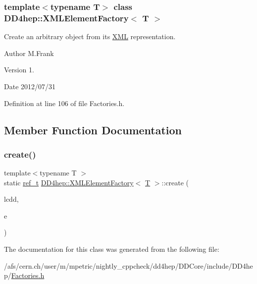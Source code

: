 \subsubsection*{template$<$typename T$>$\newline
class D\+D4hep\+::\+X\+M\+L\+Element\+Factory$<$ T $>$}

Create an arbitrary object from it\textquotesingle{}s \hyperlink{namespace_d_d4hep_1_1_x_m_l}{X\+ML} representation. 

\begin{DoxyAuthor}{Author}
M.\+Frank 
\end{DoxyAuthor}
\begin{DoxyVersion}{Version}
1. 
\end{DoxyVersion}
\begin{DoxyDate}{Date}
2012/07/31 
\end{DoxyDate}


Definition at line 106 of file Factories.\+h.



\subsection{Member Function Documentation}
\hypertarget{class_d_d4hep_1_1_x_m_l_element_factory_ae05e7a1e9fad323da9527efc778a9cd4}{}\label{class_d_d4hep_1_1_x_m_l_element_factory_ae05e7a1e9fad323da9527efc778a9cd4} 
\subsubsection{\texorpdfstring{create()}{create()}}
{\footnotesize\ttfamily template$<$typename T $>$ \\
static \hyperlink{struct_d_d4hep_1_1_plugin_factory_base_ab13458952a5b4a91f5130d3ee4db4d33}{ref\+\_\+t} \hyperlink{class_d_d4hep_1_1_x_m_l_element_factory}{D\+D4hep\+::\+X\+M\+L\+Element\+Factory}$<$ \hyperlink{class_t}{T} $>$\+::create (\begin{DoxyParamCaption}\item[{\hyperlink{class_d_d4hep_1_1_geometry_1_1_l_c_d_d}{Geometry\+::\+L\+C\+DD} \&}]{lcdd,  }\item[{\hyperlink{struct_d_d4hep_1_1_plugin_factory_base_aedebe6835e2705756763812545bcb8fd}{xml\+\_\+h}}]{e }\end{DoxyParamCaption})\hspace{0.3cm}{\ttfamily [static]}}



The documentation for this class was generated from the following file\+:\begin{DoxyCompactItemize}
\item 
/afs/cern.\+ch/user/m/mpetric/nightly\+\_\+cppcheck/dd4hep/\+D\+D\+Core/include/\+D\+D4hep/\hyperlink{_d_d_core_2include_2_d_d4hep_2_factories_8h}{Factories.\+h}\end{DoxyCompactItemize}

